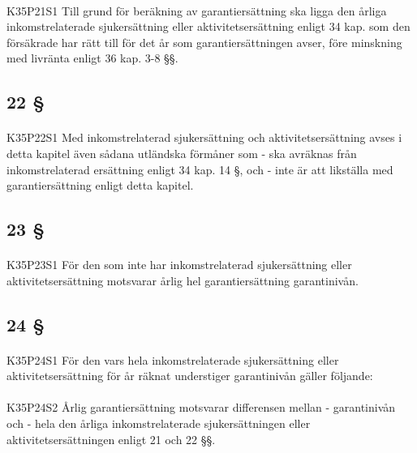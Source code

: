 \documentclass[a4paper,notitlepage,openany,10pt]{book}
\begin{document}
\paragraph*{}
{\tiny K35P21S1}
Till grund för beräkning av garantiersättning ska ligga den årliga inkomstrelaterade sjukersättning eller aktivitetsersättning enligt 34 kap. som den försäkrade har rätt till för det år som garantiersättningen avser, före minskning med livränta enligt 36 kap. 3-8 §§.
\subsection*{22 §}
\paragraph*{}
{\tiny K35P22S1}
Med inkomstrelaterad sjukersättning och aktivitetsersättning avses i detta kapitel även sådana utländska förmåner som
\newline - ska avräknas från inkomstrelaterad ersättning enligt 34 kap. 14 §, och
\newline - inte är att likställa med garantiersättning enligt detta kapitel.
\subsection*{23 §}
\paragraph*{}
{\tiny K35P23S1}
För den som inte har inkomstrelaterad sjukersättning eller aktivitetsersättning motsvarar årlig hel garantiersättning garantinivån.
\subsection*{24 §}
\paragraph*{}
{\tiny K35P24S1}
För den vars hela inkomstrelaterade sjukersättning eller aktivitetsersättning för år räknat understiger garantinivån gäller följande:
\paragraph*{}
{\tiny K35P24S2}
Årlig garantiersättning motsvarar differensen mellan
\newline - garantinivån och
\newline - hela den årliga inkomstrelaterade sjukersättningen eller aktivitetsersättningen enligt 21 och 22 §§.
\end{document}
